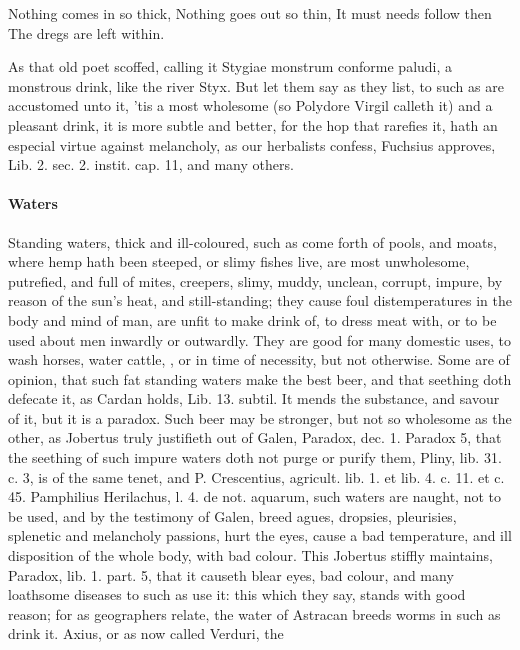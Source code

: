 {{Nothing comes in so thick,
Nothing goes out so thin,
It must needs follow then
The dregs are left within.

As that old poet scoffed, calling it Stygiae monstrum conforme
paludi, a monstrous drink, like the river Styx. But let them say as
they list, to such as are accustomed unto it, 'tis a most wholesome (so
 Polydore Virgil calleth it) and a pleasant drink, it is more
subtle and better, for the hop that rarefies it, hath an especial
virtue against melancholy, as our herbalists confess, Fuchsius
approves, Lib. 2. sec. 2. instit. cap. 11, and many others.

\paragraph{Waters} Standing waters, thick and ill-coloured, such as come forth of
pools, and moats, where hemp hath been steeped, or slimy fishes live,
are most unwholesome, putrefied, and full of mites, creepers, slimy,
muddy, unclean, corrupt, impure, by reason of the sun's heat, and
still-standing; they cause foul distemperatures in the body and mind of
man, are unfit to make drink of, to dress meat with, or to be
used about men inwardly or outwardly. They are good for many
domestic uses, to wash horses, water cattle, \etc{}, or in time of
necessity, but not otherwise. Some are of opinion, that such fat
standing waters make the best beer, and that seething doth defecate it,
as Cardan holds, Lib. 13. subtil. It mends the substance, and
savour of it, but it is a paradox. Such beer may be stronger, but not
so wholesome as the other, as Jobertus truly justifieth out of
Galen, Paradox, dec. 1. Paradox 5, that the seething of such impure
waters doth not purge or purify them, Pliny, lib. 31. c. 3, is of the
same tenet, and P. Crescentius, agricult. lib. 1. et lib. 4. c. 11. et
c. 45. Pamphilius Herilachus, l. 4. de not. aquarum, such waters are
naught, not to be used, and by the testimony of Galen, breed
agues, dropsies, pleurisies, splenetic and melancholy passions, hurt
the eyes, cause a bad temperature, and ill disposition of the whole
body, with bad colour. This Jobertus stiffly maintains, Paradox, lib.
1. part. 5, that it causeth blear eyes, bad colour, and many loathsome
diseases to such as use it: this which they say, stands with good
reason; for as geographers relate, the water of Astracan breeds worms
in such as drink it.  Axius, or as now called Verduri, the
}}
